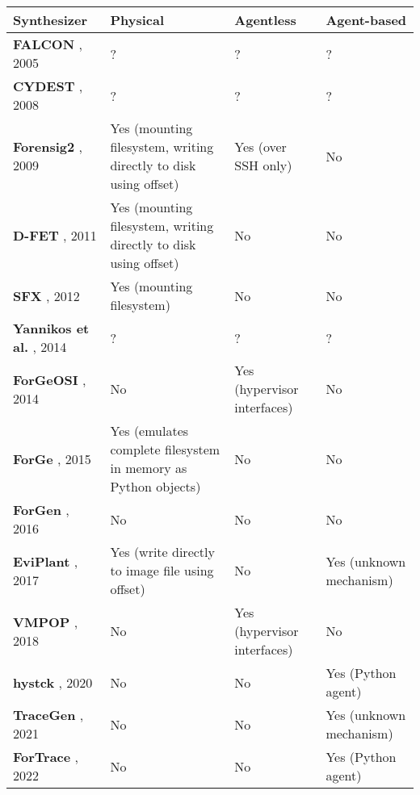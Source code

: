 \begin{longtable}[]{@{}
  >{\raggedright\arraybackslash}p{}
  >{\raggedright\arraybackslash}p{}
  >{\raggedright\arraybackslash}p{}
  >{\raggedright\arraybackslash}p{}@{}}
\toprule\noalign{}
\begin{minipage}[b]{\linewidth}\raggedright
Synthesizer
\end{minipage} & \begin{minipage}[b]{\linewidth}\raggedright
Physical
\end{minipage} & \begin{minipage}[b]{\linewidth}\raggedright
Agentless
\end{minipage} & \begin{minipage}[b]{\linewidth}\raggedright
Agent-based
\end{minipage} \\
\midrule\noalign{}
\endhead
\bottomrule\noalign{}
\endlastfoot
\textbf{FALCON} \cite{adelsteinAutomaticallyCreatingRealistic2005},
2005 & ? & ? & ? \\
\textbf{CYDEST} \cite{bruecknerAutomatedComputerForensics2008}, 2008
& ? & ? & ? \\
\textbf{Forensig2}
\cite{mochForensicImageGenerator2009,mochEvaluatingForensicImage2012},
2009 & Yes (mounting filesystem, writing directly to disk using offset)
& Yes (over SSH only) & No \\
\textbf{D-FET} \cite{williamCloudbasedDigitalForensics2011}, 2011 &
Yes (mounting filesystem, writing directly to disk using offset) & No &
No \\
\textbf{SFX} \cite{russellForensicImageDescription2012}, 2012 & Yes
(mounting filesystem) & No & No \\
\textbf{Yannikos et al.} \cite{yannikosDataCorporaDigital2014}, 2014
& ? & ? & ? \\
\textbf{ForGeOSI} \cite{maxfraggMaxfraggForGeOSI2023}, 2014 & No &
Yes (hypervisor interfaces) & No \\
\textbf{ForGe} \cite{vistiAutomaticCreationComputer2015}, 2015 & Yes
(emulates complete filesystem in memory as Python objects) & No & No \\
\textbf{ForGen} \cite{jjk422Jjk422ForGen2019}, 2016 & No & No &
No \\
\textbf{EviPlant} \cite{scanlonEviPlantEfficientDigital2017}, 2017 &
Yes (write directly to image file using offset) & No & Yes (unknown
mechanism) \\
\textbf{VMPOP} \cite{parkTREDEVMPOPCultivating2018}, 2018 & No & Yes
(hypervisor interfaces) & No \\
\textbf{hystck} \cite{gobelNovelApproachGenerating2020}, 2020 & No &
No & Yes (Python agent) \\
\textbf{TraceGen} \cite{duTraceGenUserActivity2021}, 2021 & No & No
& Yes (unknown mechanism) \\
\textbf{ForTrace} \cite{gobelForTraceHolisticForensic2022}, 2022 &
No & No & Yes (Python agent) \\
\end{longtable}


